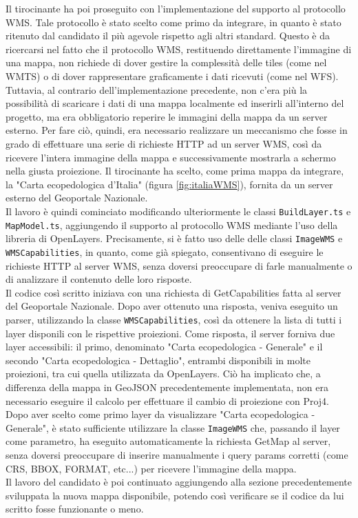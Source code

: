Il tirocinante ha poi proseguito con l'implementazione del supporto al protocollo WMS. Tale protocollo è stato scelto come primo da integrare, in quanto è stato ritenuto dal candidato il più agevole rispetto agli altri standard. Questo è da ricercarsi nel fatto che il protocollo WMS, restituendo direttamente l'immagine di una mappa, non richiede di dover gestire la complessità delle tiles (come nel WMTS) o di dover rappresentare graficamente i dati ricevuti (come nel WFS).
\\Tuttavia, al contrario dell'implementazione precedente, non c'era più la possibilità di scaricare i dati di una mappa localmente ed inserirli all'interno del progetto, ma era obbligatorio reperire le immagini della mappa da un server esterno. Per fare ciò, quindi, era necessario realizzare un meccanismo che fosse in grado di effettuare una serie di richieste HTTP ad un server WMS, così da ricevere l'intera immagine della mappa e successivamente mostrarla a schermo nella giusta proiezione. Il tirocinante ha scelto, come prima mappa da integrare, la "Carta ecopedologica d'Italia" (figura \ref{fig:italiaWMS}), fornita da un server esterno del Geoportale Nazionale.
\\Il lavoro è quindi cominciato modificando ulteriormente le classi \verb|BuildLayer.ts| e \verb|MapModel.ts|, aggiungendo il supporto al protocollo WMS mediante l'uso della libreria di OpenLayers. Precisamente, si è fatto uso delle delle classi \verb|ImageWMS| e \verb|WMSCapabilities|, in quanto, come già spiegato, consentivano di eseguire le richieste HTTP al server WMS, senza doversi preoccupare di farle manualmente o di analizzare il contenuto delle loro risposte.
\\Il codice così scritto iniziava con una richiesta di GetCapabilities fatta al server del Geoportale Nazionale. Dopo aver ottenuto una risposta, veniva eseguito un parser, utilizzando la classe \verb|WMSCapabilities|, così da ottenere la lista di tutti i layer disponili con le rispettive proiezioni. Come risposta, il server forniva due layer accessibili: il primo, denominato "Carta ecopedologica - Generale" e il secondo "Carta ecopedologica - Dettaglio", entrambi disponibili in molte proiezioni, tra cui quella utilizzata da OpenLayers. Ciò ha implicato che, a differenza della mappa in GeoJSON precedentemente implementata, non era necessario eseguire il calcolo per effettuare il cambio di proiezione con Proj4.
\\Dopo aver scelto come primo layer da visualizzare "Carta ecopedologica - Generale", è stato sufficiente utilizzare la classe \verb|ImageWMS| che, passando il layer come parametro, ha eseguito automaticamente la richiesta GetMap al server, senza doversi preoccupare di inserire manualmente i query params corretti (come CRS, BBOX, FORMAT, etc...) per ricevere l'immagine della mappa.
\\Il lavoro del candidato è poi continuato aggiungendo alla sezione precedentemente sviluppata la nuova mappa disponibile, potendo così verificare se il codice da lui scritto fosse funzionante o meno.

